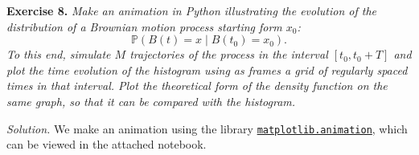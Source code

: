 
\textbf{Exercise 8.} \textit{Make an animation in Python illustrating the evolution of the distribution of a Brownian motion process starting form $x_0$:}
\[
\mathbb P(B(t)=x\mid B(t_0)=x_0).
\]
\textit{To this end, simulate $M$ trajectories of the process in the interval $[t_0 , t_0 + T ]$ and plot the time evolution of the histogram using as frames a grid of regularly spaced times in that interval. Plot the theoretical form of the density function on the same graph, so that it can be compared with the histogram.}

\textit{Solution.} We make an animation using the library \href{https://matplotlib.org/3.1.1/api/animation_api.html}{\texttt{matplotlib.animation}}, which can be viewed in the attached notebook.
